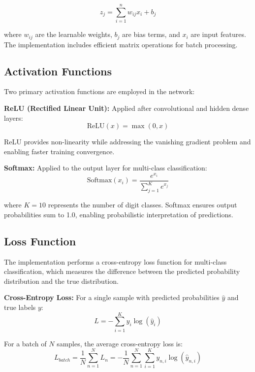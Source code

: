 \documentclass[conference]{IEEEtran}
\begin{document}
\begin{equation}
z_j = \sum_{i=1}^{n} w_{ij} x_i + b_j
\end{equation}

where $w_{ij}$ are the learnable weights, $b_j$ are bias terms, and $x_i$ are input features. The implementation includes efficient matrix operations for batch processing.

\subsection{Activation Functions}
Two primary activation functions are employed in the network:

\textbf{ReLU (Rectified Linear Unit):} Applied after convolutional and hidden dense layers:
\begin{equation}
\text{ReLU}(x) = \max(0, x)
\end{equation}

ReLU provides non-linearity while addressing the vanishing gradient problem and enabling faster training convergence.

\textbf{Softmax:} Applied to the output layer for multi-class classification:
\begin{equation}
\text{Softmax}(x_i) = \frac{e^{x_i}}{\sum_{j=1}^{K} e^{x_j}}
\end{equation}

where $K=10$ represents the number of digit classes. Softmax ensures output probabilities sum to 1.0, enabling probabilistic interpretation of predictions.

\subsection{Loss Function}
The implementation performs a cross-entropy loss function for multi-class classification, which measures the difference between the predicted probability distribution and the true distribution.

\textbf{Cross-Entropy Loss:} For a single sample with predicted probabilities $\hat{y}$ and true labels $y$:
\begin{equation}
L = -\sum_{i=1}^{K} y_i \log(\hat{y}_i)
\end{equation}

For a batch of $N$ samples, the average cross-entropy loss is:
\begin{equation}
L_{batch} = \frac{1}{N} \sum_{n=1}^{N} L_n = -\frac{1}{N} \sum_{n=1}^{N} \sum_{i=1}^{K} y_{n,i} \log(\hat{y}_{n,i})
\end{equation}
\end{document}
